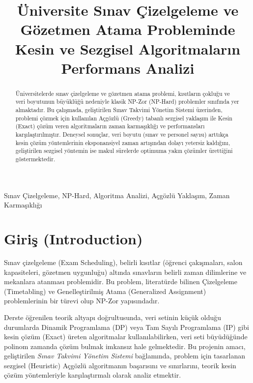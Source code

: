 \documentclass[conference]{IEEEtran}
\begin{document}
\title{Üniversite Sınav Çizelgeleme ve Gözetmen Atama Probleminde Kesin ve Sezgisel Algoritmaların Performans Analizi\\
}

\author{
}

\maketitle

\begin{abstract}
Üniversitelerde sınav çizelgeleme ve gözetmen atama problemi, kısıtların çokluğu ve veri boyutunun büyüklüğü nedeniyle klasik NP-Zor (NP-Hard) problemler sınıfında yer almaktadır. Bu çalışmada, geliştirilen Sınav Takvimi Yönetim Sistemi üzerinden, problemi çözmek için kullanılan Açgözlü (Greedy) tabanlı sezgisel yaklaşım ile Kesin (Exact) çözüm veren algoritmaların zaman karmaşıklığı ve performansları karşılaştırılmıştır. Deneysel sonuçlar, veri boyutu (sınav ve personel sayısı) arttıkça kesin çözüm yöntemlerinin eksponansiyel zaman artışından dolayı yetersiz kaldığını, geliştirilen sezgisel yöntemin ise makul sürelerde optimuma yakın çözümler ürettiğini göstermektedir.
\end{abstract}

\begin{IEEEkeywords}
Sınav Çizelgeleme, NP-Hard, Algoritma Analizi, Açgözlü Yaklaşım, Zaman Karmaşıklığı
\end{IEEEkeywords}

\section{Giriş (Introduction)}
Sınav çizelgeleme (Exam Scheduling), belirli kısıtlar (öğrenci çakışmaları, salon kapasiteleri, gözetmen uygunluğu) altında sınavların belirli zaman dilimlerine ve mekanlara atanması problemidir. Bu problem, literatürde bilinen Çizelgeleme (Timetabling) ve Genelleştirilmiş Atama (Generalized Assignment) problemlerinin bir türevi olup NP-Zor yapısındadır. 

Derste öğrenilen teorik altyapı doğrultusunda, veri setinin küçük olduğu durumlarda Dinamik Programlama (DP) veya Tam Sayılı Programlama (IP) gibi kesin çözüm (Exact) üreten algoritmalar kullanılabilirken, veri seti büyüdüğünde polinom zamanda çözüm bulmak imkansız hale gelmektedir. Bu projenin amacı, geliştirilen \textit{Sınav Takvimi Yönetim Sistemi} bağlamında, problem için tasarlanan sezgisel (Heuristic) Açgözlü algoritmanın başarısını ve sınırlarını, teorik kesin çözüm yöntemleriyle karşılaştırmalı olarak analiz etmektir.
\end{document}
